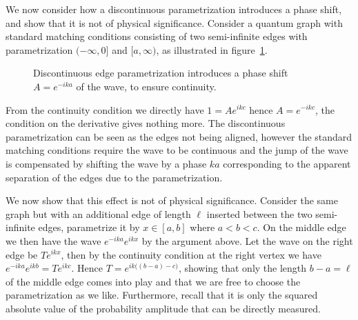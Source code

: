 \begin{example}\label{ex: phase shift due to edge parametrization}
  We now consider how a discontinuous parametrization introduces a phase shift, and show that it is not of physical significance. Consider a quantum graph with standard matching conditions consisting of two semi-infinite edges with parametrization $(-\infty,0]$ and $[a,\infty)$, as illustrated in figure~\ref{fig: discontinuous parametrization of the line}.
  \begin{figure}[h]
    \centering
    \caption{Discontinuous edge parametrization introduces a phase shift $A = e^{-ika}$ of the wave, to ensure continuity.}
    \label{fig: discontinuous parametrization of the line}
  \end{figure}
  From the continuity condition we directly have $1 = Ae^{ikc}$ hence $A = e^{-ikc}$, the condition on the derivative gives nothing more. The discontinuous parametrization can be seen as the edges not being aligned, however the standard matching conditions require the wave to be continuous and the jump of the wave is compensated by shifting the wave by a phase $ka$ corresponding to the apparent separation of the edges due to the parametrization.

  We now show that this effect is not of physical significance. Consider the same graph but with an additional edge of length $\ell$ inserted between the two semi-infinite edges, parametrize it by $x \in [a,b]$ where $a < b < c$. On the middle edge we then have the wave $e^{-ika}e^{ikx}$ by the argument above. Let the wave on the right edge be $Te^{ikx}$, then by the continuity condition at the right vertex we have $e^{-ika}e^{ikb} = Te^{ikc}$. Hence $T = e^{ik\big((b-a)-c\big)}$, showing that only the length $b-a = \ell$ of the middle edge comes into play and that we are free to choose the parametrization as we like.
  Furthermore, recall that it is only the squared absolute value of the probability amplitude that can be directly measured.
\end{example}


